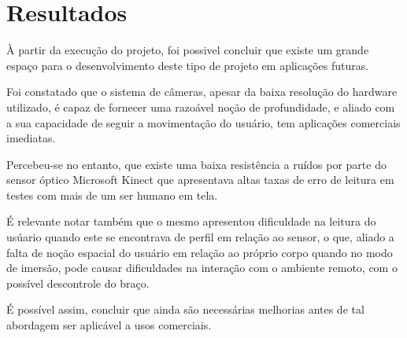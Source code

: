 \section{Resultados}\label{sec-resultados}	
À partir da execução do projeto, foi possivel concluir que existe um grande espaço para o desenvolvimento deste tipo de projeto em aplicações futuras.\par
Foi constatado que o sistema de câmeras, apesar da baixa resolução do hardware utilizado, é capaz de fornecer uma razoável noção de profundidade, e aliado com a sua capacidade de seguir a movimentação do usuário, tem aplicações comerciais imediatas.\par
Percebeu-se no entanto, que existe uma baixa resistência a ruídos por parte do sensor óptico Microsoft Kinect que apresentava altas taxas de erro de leitura em testes com mais de um ser humano em tela. \par
 É relevante notar também que o mesmo apresentou dificuldade na leitura do usúario quando este se encontrava de perfil em relação ao sensor, o que, aliado a falta de noção espacial do usuário em relação ao próprio corpo quando no modo de imersão, pode causar dificuldades na interação com o ambiente remoto, com o possível descontrole do braço.\par
 É possível assim, concluir que ainda são necessárias melhorias antes de tal abordagem ser aplicável a usos comerciais.